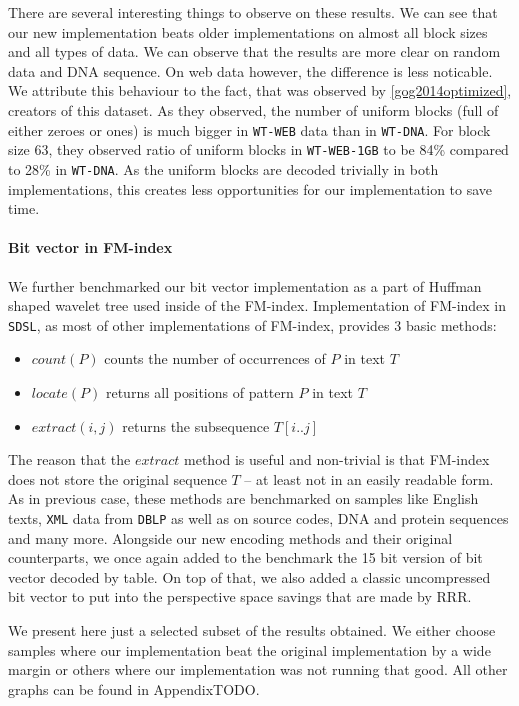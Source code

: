There are several interesting things to observe on these results. We can see that our new implementation
beats older implementations on almost all block sizes and all types of data. We can observe that the
results are more clear on random data and DNA sequence. On web data however, the difference is less
noticable. We attribute this behaviour to the fact, that was observed by \ref{gog2014optimized},
creators of this dataset. As they observed, the number of uniform blocks (full of either zeroes or ones)
is much bigger in \texttt{WT-WEB} data than in \texttt{WT-DNA}. For block size 63, they observed ratio of
uniform blocks in \texttt{WT-WEB-1GB} to be 84\% compared to 28\% in \texttt{WT-DNA}. As the uniform
blocks are decoded trivially in both implementations, this creates less opportunities for our implementation
to save time.

\paragraph{Bit vector in FM-index}

We further benchmarked our bit vector implementation as a part of Huffman shaped wavelet tree
used inside of the FM-index. Implementation of FM-index in \texttt{SDSL}, as most of other
implementations of FM-index, provides 3 basic methods:

\begin{itemize}
	\item $\mathit{count}(P)$ counts the number of occurrences of $P$ in text $T$
	\item $\mathit{locate}(P)$ returns all positions of pattern $P$ in text $T$
	\item $\mathit{extract}(i, j)$ returns the subsequence $T[i..j]$
\end{itemize}

The reason that the $\mathit{extract}$ method is useful and non-trivial is that FM-index
does not store the original sequence $T$ -- at least not in an easily readable form.
As in previous case, these methods are benchmarked on samples like English texts, \texttt{XML}
data from \texttt{DBLP} as well as on source codes, DNA and protein sequences and many more.
Alongside our new encoding methods and their original counterparts, we once again added
to the benchmark the 15 bit version of bit vector decoded by table. On top of that, we
also added a classic uncompressed bit vector to put into the perspective space savings that
are made by RRR.

We present here just a selected subset of the results obtained. We either choose samples
where our implementation beat the original implementation by a wide margin or others where
our implementation was not running that good. All other graphs can be found in AppendixTODO.

